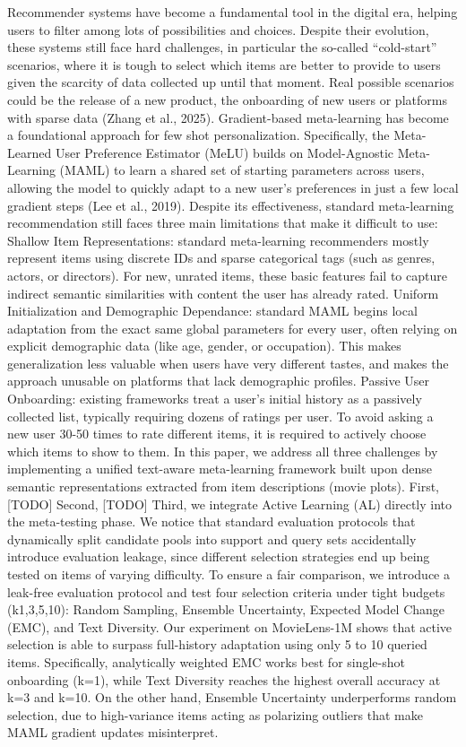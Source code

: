 \documentclass[10pt,twocolumn,letterpaper]{article}
\begin{document}
Recommender systems have become a fundamental tool in the digital era, helping users to filter among lots of possibilities and choices. Despite their evolution, these systems still face hard challenges, in particular the so-called “cold-start” scenarios, where it is tough to select which items are better to provide to users given the scarcity of data collected up until that moment. Real possible scenarios could be the release of a new product, the onboarding of new users or platforms with sparse data (Zhang et al., 2025). Gradient-based meta-learning has become a foundational approach for few shot personalization. Specifically, the Meta-Learned User Preference Estimator (MeLU) builds on Model-Agnostic Meta-Learning (MAML) to learn a shared set of starting parameters across users, allowing the model to quickly adapt to a new user’s preferences in just a few local gradient steps (Lee et al., 2019). Despite its effectiveness, standard meta-learning recommendation still faces three main limitations that make it difficult to use:
Shallow Item Representations: standard meta-learning recommenders mostly represent items using discrete IDs and sparse categorical tags (such as genres, actors, or directors). For new, unrated items, these basic features fail to capture indirect semantic similarities with content the user has already rated.
Uniform Initialization and Demographic Dependance: standard MAML begins local adaptation from the exact same global parameters for every user, often relying on explicit demographic data (like age, gender, or occupation). This makes generalization less valuable when users have very different tastes, and makes the approach unusable on platforms that lack demographic profiles.
Passive User Onboarding: existing frameworks treat a user’s initial history as a passively collected list, typically requiring dozens of ratings per user. To avoid asking a new user 30-50 times to rate different items, it is required to actively choose which items to show to them.
In this paper, we address all three challenges by implementing a unified text-aware meta-learning framework built upon dense semantic representations extracted from item descriptions (movie plots). 
First, [TODO]
Second, [TODO]
Third, we integrate Active Learning (AL) directly into the meta-testing phase. We notice that standard evaluation protocols that dynamically split candidate pools into support and query sets accidentally introduce evaluation leakage, since different selection strategies end up being tested on items of varying difficulty. To ensure a fair comparison, we introduce a leak-free evaluation protocol and test four selection criteria under tight budgets (k{1,3,5,10}): Random Sampling, Ensemble Uncertainty, Expected Model Change (EMC), and Text Diversity. Our experiment on MovieLens-1M shows that active selection is able to surpass full-history adaptation using only 5 to 10 queried items. Specifically, analytically weighted EMC works best for single-shot onboarding (k=1), while Text Diversity reaches the highest overall accuracy at k=3 and k=10. On the other hand, Ensemble Uncertainty underperforms random selection, due to high-variance items acting as polarizing outliers that make MAML gradient updates misinterpret.
\end{document}
